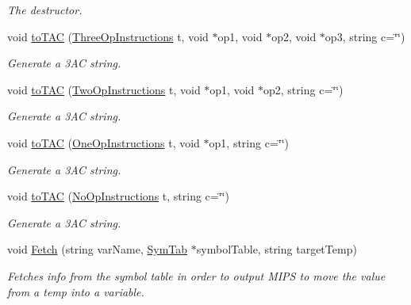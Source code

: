 \begin{DoxyCompactItemize}
\begin{DoxyCompactList}\small\item\em The destructor. \end{DoxyCompactList}\item 
void \hyperlink{classTAC__Generator_aacf385dd067825fd35a315d04ea9c78f}{to\-T\-A\-C} (\hyperlink{classTAC__Generator_ae032b80a215a10604c5273b65e7dab4c}{Three\-Op\-Instructions} t, void $\ast$op1, void $\ast$op2, void $\ast$op3, string c=\char`\"{}\char`\"{})
\begin{DoxyCompactList}\small\item\em Generate a 3\-A\-C string. \end{DoxyCompactList}\item 
void \hyperlink{classTAC__Generator_a7e5f15afb7c6b13793db76d1091f113c}{to\-T\-A\-C} (\hyperlink{classTAC__Generator_a4e5a63c4a55a85d34f6ffebe5bf48129}{Two\-Op\-Instructions} t, void $\ast$op1, void $\ast$op2, string c=\char`\"{}\char`\"{})
\begin{DoxyCompactList}\small\item\em Generate a 3\-A\-C string. \end{DoxyCompactList}\item 
void \hyperlink{classTAC__Generator_a78507356e58ed7ff406314e8ce566ad8}{to\-T\-A\-C} (\hyperlink{classTAC__Generator_ab58b7044cb5d16a454f4e01514175123}{One\-Op\-Instructions} t, void $\ast$op1, string c=\char`\"{}\char`\"{})
\begin{DoxyCompactList}\small\item\em Generate a 3\-A\-C string. \end{DoxyCompactList}\item 
void \hyperlink{classTAC__Generator_a0ee1e11b169a2ead7244c00869d66858}{to\-T\-A\-C} (\hyperlink{classTAC__Generator_a3942f3e280fb83e44ad85eb13d56dfb5}{No\-Op\-Instructions} t, string c=\char`\"{}\char`\"{})
\begin{DoxyCompactList}\small\item\em Generate a 3\-A\-C string. \end{DoxyCompactList}\item 
void \hyperlink{classTAC__Generator_aacf5782b612a76a148478154306d3216}{Fetch} (string var\-Name, \hyperlink{classSymTab}{Sym\-Tab} $\ast$symbol\-Table, string target\-Temp)
\begin{DoxyCompactList}\small\item\em Fetches info from the symbol table in order to output M\-I\-P\-S to move the value from a temp into a variable. \end{DoxyCompactList}\item 

\end{DoxyCompactItemize}
